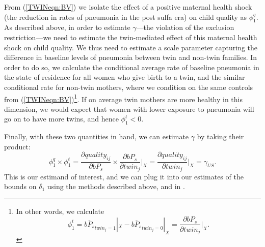 \documentclass[subeqn]{article}
\begin{document}
\begin{spacing}{1.4}
From (\ref{TWINeqn:BV}) we isolate the effect of a positive maternal health
shock (the reduction in rates of pneumonia in the post sulfa era) on child
quality as $\phi^q_1$.  As described above, in order to estimate $\gamma$---the
violation of the exclusion restriction---we need to estimate the twin-mediated
effect of this maternal health shock on child quality.  We thus need to estimate
a scale parameter capturing the difference in baseline levels of pneumonia
between twin and non-twin families. %
In order to do so, we calculate the conditional average rate of baseline
pneumonia in the state of residence for all women who give birth to a twin, and
the similar conditional rate for non-twin mothers, where we condition on the same
controls from (\ref{TWINeqn:BV})\footnote{In other words, we calculate
  \[ \phi_1^t=\overline{bP_s}_{twin_j=1}|_{X}-\overline{bP_s}_{twin_j=0}|_{X}=
  \frac{\partial bP_s}{\partial twin_j}\bigg|_{X}.
  \]
}.  If on average twin mothers are more healthy in
this dimension, we would expect that women with lower exposure to pneumonia will
go on to have more twins, and hence $\phi_1^t<0$.

Finally, with these two quantities in hand, we can estimate $\gamma$ by taking
their product:
\begin{equation}
  \label{TWINeqn:realgamma}
  \phi_1^q\times\phi_1^t=\frac{\partial quality_{ij}}{\partial bP_s}\times
  \frac{\partial bP_s}{\partial twin_j}\bigg|_{X}=
  \frac{\partial quality_{ij}}{\partial twin_j}\bigg|_{X}=\gamma_{US}.
\end{equation}
This is our estimand of interest, and we can plug it into our estimates of
the bounds on $\delta_1$ using the methods described above, and in
\citet{Conleyetal2012}.




\end{spacing}
\end{document}

